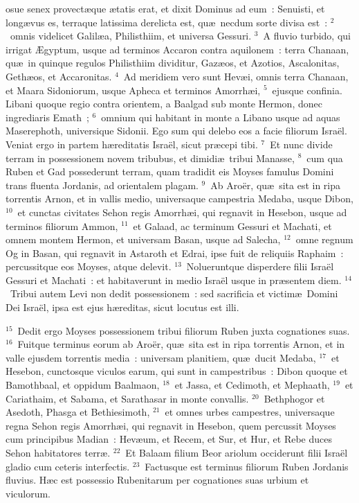 \bchapter
{}osue senex provect\ae que \ae tatis erat, et dixit Dominus ad eum~: Senuisti, et long\ae vus es, terraque latissima derelicta est, qu\ae\ necdum sorte divisa est~:
${}^{2}$~omnis videlicet Galil\ae a, Philisthiim, et universa Gessuri.
${}^{3}$~A fluvio turbido, qui irrigat \AE gyptum, usque ad terminos Accaron contra aquilonem~: terra Chanaan, qu\ae\ in quinque regulos Philisthiim dividitur, Gaz\ae os, et Azotios, Ascalonitas, Geth\ae os, et Accaronitas.
${}^{4}$~Ad meridiem vero sunt Hev\ae i, omnis terra Chanaan, et Maara Sidoniorum, usque Apheca et terminos Amorrh\ae i,
${}^{5}$~ejusque confinia. Libani quoque regio contra orientem, a Baalgad sub monte Hermon, donec ingrediaris Emath~;
${}^{6}$~omnium qui habitant in monte a Libano usque ad aquas Maserephoth, universique Sidonii. Ego sum qui delebo eos a facie filiorum Isra\"el. Veniat ergo in partem h\ae reditatis Isra\"el, sicut pr\ae cepi tibi.
${}^{7}$~Et nunc divide terram in possessionem novem tribubus, et dimidi\ae\ tribui Manasse,
${}^{8}$~cum qua Ruben et Gad possederunt terram, quam tradidit eis Moyses famulus Domini trans fluenta Jordanis, ad orientalem plagam.
${}^{9}$~Ab Aro\"er, qu\ae\ sita est in ripa torrentis Arnon, et in vallis medio, universaque campestria Medaba, usque Dibon,
${}^{10}$~et cunctas civitates Sehon regis Amorrh\ae i, qui regnavit in Hesebon, usque ad terminos filiorum Ammon,
${}^{11}$~et Galaad, ac terminum Gessuri et Machati, et omnem montem Hermon, et universam Basan, usque ad Salecha,
${}^{12}$~omne regnum Og in Basan, qui regnavit in Astaroth et Edrai, ipse fuit de reliquiis Raphaim~: percussitque eos Moyses, atque delevit.
${}^{13}$~Nolueruntque disperdere filii Isra\"el Gessuri et Machati~: et habitaverunt in medio Isra\"el usque in pr\ae sentem diem.
${}^{14}$~Tribui autem Levi non dedit possessionem~: sed sacrificia et victim\ae\ Domini Dei Isra\"el, ipsa est ejus h\ae reditas, sicut locutus est illi.


${}^{15}$~Dedit ergo Moyses possessionem tribui filiorum Ruben juxta cognationes suas.
${}^{16}$~Fuitque terminus eorum ab Aro\"er, qu\ae\ sita est in ripa torrentis Arnon, et in valle ejusdem torrentis media~: universam planitiem, qu\ae\ ducit Medaba,
${}^{17}$~et Hesebon, cunctosque viculos earum, qui sunt in campestribus~: Dibon quoque et Bamothbaal, et oppidum Baalmaon,
${}^{18}$~et Jassa, et Cedimoth, et Mephaath,
${}^{19}$~et Cariathaim, et Sabama, et Sarathasar in monte convallis.
${}^{20}$~Bethphogor et Asedoth, Phasga et Bethiesimoth,
${}^{21}$~et omnes urbes campestres, universaque regna Sehon regis Amorrh\ae i, qui regnavit in Hesebon, quem percussit Moyses cum principibus Madian~: Hev\ae um, et Recem, et Sur, et Hur, et Rebe duces Sehon habitatores terr\ae .
${}^{22}$~Et Balaam filium Beor ariolum occiderunt filii Isra\"el gladio cum ceteris interfectis.
${}^{23}$~Factusque est terminus filiorum Ruben Jordanis fluvius. H\ae c est possessio Rubenitarum per cognationes suas urbium et viculorum.


